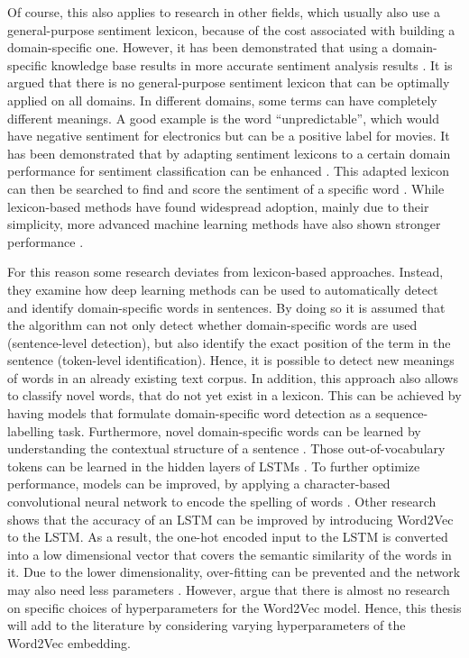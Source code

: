 \documentclass[11pt, a4paper]{article}
\begin{document}
Of course, this also applies to research in other fields, which usually also use a general-purpose sentiment lexicon, 
because of the cost associated with building a domain-specific one. However, it has been demonstrated that using a domain-specific 
knowledge base results in more accurate sentiment analysis results \citep{park2015EfficientExtraction}.
It is argued that there is no general-purpose sentiment lexicon that can be optimally applied on all domains. 
In different domains, some terms can have completely different meanings. A good example is the word “unpredictable”, 
which would have negative sentiment for electronics but can be a positive label for movies. It has been demonstrated 
that by adapting sentiment lexicons to a certain domain performance for sentiment classification can be enhanced 
\citep{Lu2011automaticconstruction}. This adapted lexicon can then be searched to find and score the sentiment 
of a specific word \citep{ashgar2014DetectionSlang}. 
While lexicon-based methods have found widespread adoption, mainly due to their simplicity, more advanced machine 
learning methods have also shown stronger performance \citep{wang2020automaticconstructiondomainsentiment}.

For this reason some research deviates from lexicon-based approaches. Instead, they examine how deep learning methods can be 
used to automatically detect and identify domain-specific words in sentences. By doing so it is assumed that the 
algorithm can not only detect whether domain-specific words are used (sentence-level detection), but also identify 
the exact position of the term in the sentence (token-level identification). Hence, it is possible to detect new meanings 
of words in an already existing text corpus. In addition, this approach also allows to classify novel words, that do not yet 
exist in a lexicon. 
This can be achieved by having models that formulate domain-specific word detection as a 
sequence-labelling task. Furthermore, novel domain-specific words can be learned by understanding the contextual 
structure of a sentence \citep{pei2019slang}. Those out-of-vocabulary tokens can be learned in the hidden layers of 
LSTMs \citep{hochreiter1997lstm}. To further optimize performance, models can be improved, by applying a character-based 
convolutional neural network to encode the spelling of words \citep{pei2019slang}. Other research shows that the accuracy of an
LSTM can be improved by introducing Word2Vec to the LSTM. As a result, the one-hot encoded input to the LSTM is
converted into a low dimensional vector that covers the semantic similarity of the words in it. Due to the lower dimensionality,
over-fitting can be prevented and the network may also need less parameters \citep{xiao2018word2veclstm}. However, \cite{giovanni2021word2vec}
argue that there is almost no research on specific choices of hyperparameters for the Word2Vec model. Hence, this thesis will add to the literature
by considering varying hyperparameters of the Word2Vec embedding.
\end{document}

